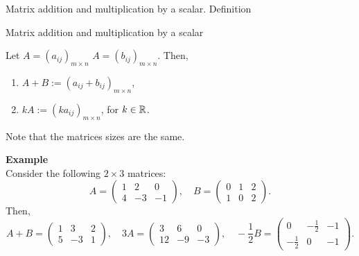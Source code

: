 \documentclass[9pt]{beamer}
\begin{document}
\begin{frame}{Matrix addition and multiplication by a scalar. Definition}

    \begin{block}{Matrix addition and multiplication by a scalar}

        Let $A = (a_{ij})_{m\times n}$ $A = (b_{ij})_{m\times n}$. Then,

        \begin{enumerate}[leftmargin = 0.8cm, label = $\bullet$, rightmargin = 0.2cm]

        \item $A + B := (a_{ij}+b_{ij})_{m\times n}$,

        \item $kA := (ka_{ij})_{m\times n}$, for $k\in\mathbb{R}$.
        
        \end{enumerate}

        Note that the matrices sizes are the same.
    \end{block}

    \textbf{Example}\\
        Consider the following $2\times 3$ matrices:
        $$
        A = 
        \begin{pmatrix}
        1 & 2 & 0 \\
        4 & -3 & -1
        \end{pmatrix},\quad
        B = 
        \begin{pmatrix}
        0 & 1 & 2 \\
        1 & 0 & 2
        \end{pmatrix}.
        $$
        Then,
        $$
        A + B = 
        \begin{pmatrix}
        1 & 3 & 2 \\
        5 & -3 & 1
        \end{pmatrix},\quad
        3A = 
        \begin{pmatrix}
        3 & 6 & 0 \\
        12 & -9 & -3
        \end{pmatrix},\quad
        -\frac{1}{2}B = 
        \begin{pmatrix}
        0 & -\frac{1}{2} & -1 \\
        -\frac{1}{2} & 0 & -1
        \end{pmatrix}.
        $$
    
\end{frame}
\end{document}
